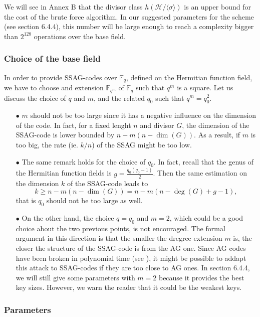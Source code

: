 \documentclass[10pt]{article}
\theoremstyle{definition}
\theoremstyle{definition}
\theoremstyle{definition}
\newcommand{\s}{\vspace{0.3cm}}
\newcommand{\calH}{\mathcal{H}}
\newcommand{\fqm}{\mathbb{F}_{q^m}}
\newcommand{\fq}{\mathbb{F}_q}
\begin{document}
\s 

We will see in Annex B that the divisor class $h(\calH/\langle \sigma \rangle)$
is an upper bound for the cost of the brute force algorithm. In our suggested parameters for the scheme (see section 6.4.4), this number will be large enough to reach a complexity bigger than $2^{128}$ operations over the base field.

\s

\subsubsection{Choice of the base field}

\s

In order to provide SSAG-codes over $\fq$, defined on the Hermitian function field, we have to choose and extension $\fqm$ of $\fq$ such that $q^m$ is a square. Let us discuss the choice of $q$ and $m$, and the related $q_0$ such that $q^m=q_0^2$.

\begin{enumerate}
\item[$\bullet$] $m$ should not be too large since it has a negative influence on the dimension of the code. In fact, for a fixed lenght $n$ and divisor $G$, the dimension of the SSAG-code is lower bounded by $n-m(n-\dim(G))$. As a result, if $m$ is too big, the rate (ie. $k/n$) of the SSAG might be too low.
\item[$\bullet$] The same remark holds for the choice of $q_0$. In fact, recall that the genus of the Hermitian function fields is $g=\frac{q_0(q_0-1)}{2}$. Then the same estimation on the dimension $k$ of the SSAG-code leads to 
\[k \geq n-m(n-\dim(G)) = n-m(n- \deg(G) +g-1),\]
that is $q_0$ should not be too large as well.
\item[$\bullet$] On the other hand, the choice $q=q_0$ and $m=2$, which could be a good choice about the two previous points, is not encouraged. The formal argument in this direction is that the smaller the dregree extension $m$ is, the closer the structure of the SSAG-code is from the AG one. Since AG codes have been broken in polynomial time (see \cite{Cou}), it might be possible to addapt this attack to SSAG-codes if they are too close to AG ones. In section 6.4.4, we will still give some parameters with $m=2$ because it provides the best key sizes. However, we warn the reader that it could be the weakest keys. 
\end{enumerate}

\s 

 \subsubsection{Parameters} 
\end{document}
